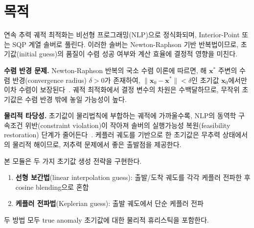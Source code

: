 \documentclass[11pt]{article}
\begin{document}
\drawborder
\thispagestyle{firstpage}

\def\lighterdate{February 12, 2026}

\begin{abstract}
연속 추력 궤적 최적화에서 NLP 솔버의 수렴 성공 여부는 초기값(initial guess)의 품질에 결정적으로 의존한다.
본 보고서는 두 가지 초기값 생성 전략---선형 보간법(cosine blending 기반)과 케플러 전파법---의 수학적 배경,
구현 매핑, 그리고 수치 검증 결과를 기술한다.
Universal Variable Formulation에 의한 케플러 전파, cosine blending에 의한 출발/도착 궤적 혼합,
그리고 true anomaly에 대한 물리적 휴리스틱을 포함한다.
\end{abstract}


\section{목적}
\label{sec:purpose}

연속 추력 궤적 최적화는 비선형 프로그래밍(NLP)으로 정식화되며, Interior-Point 또는 SQP 계열 솔버로 풀린다.
이러한 솔버는 Newton-Raphson 기반 반복법이므로, 초기값(initial guess)의 품질이 수렴 성공 여부와 계산 효율에 결정적 영향을 미친다.

\textbf{수렴 반경 문제.}
Newton-Raphson 반복의 국소 수렴 이론에 따르면, 해 $\mathbf{x}^*$ 주변의 수렴 반경(convergence radius) $\delta > 0$가 존재하여,
$\|\mathbf{x}_0 - \mathbf{x}^*\| < \delta$인 초기값 $\mathbf{x}_0$에서만 이차 수렴이 보장된다~\cite{Nocedal2006}.
궤적 최적화에서 결정 변수의 차원은 수백 달하므로, 무작위 초기값은 수렴 반경 밖에 놓일 가능성이 높다.

\textbf{물리적 타당성.}
초기값이 물리법칙에 부합하는 궤적에 가까울수록, NLP의 동역학 구속조건 위반(constraint violation)이 작아져
솔버의 실행가능성 복원(feasibility restoration) 단계가 줄어든다~\cite{Wachter2006}.
케플러 궤도를 기반으로 한 초기값은 무추력 상태에서의 물리적 해이므로, 저추력 문제에서 좋은 출발점을 제공한다.

본 모듈은 두 가지 초기값 생성 전략을 구현한다.
\begin{enumerate}[nosep]
  \item \textbf{선형 보간법}(linear interpolation guess): 출발/도착 궤도를 각각 케플러 전파한 후 cosine blending으로 혼합
  \item \textbf{케플러 전파법}(Keplerian guess): 출발 궤도에서 단순 케플러 전파
\end{enumerate}
두 방법 모두 true anomaly 초기값에 대한 물리적 휴리스틱을 포함한다.
\end{document}
